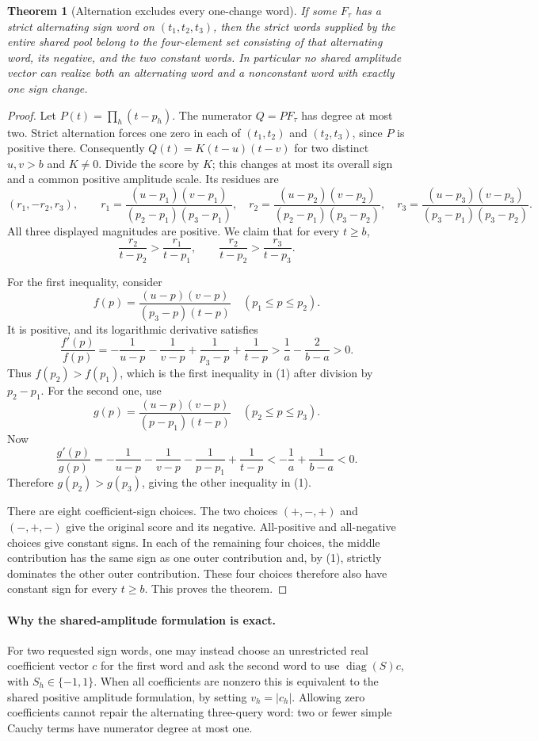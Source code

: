 \documentclass[11pt]{article}
\newtheorem{theorem}{Theorem}
\begin{document}
\begin{theorem}[Alternation excludes every one-change word]
If some $F_\tau$ has a strict alternating sign word on
$(t_1,t_2,t_3)$, then the strict words supplied by the entire shared
pool belong to the four-element set consisting of that alternating
word, its negative, and the two constant words. In particular no
shared amplitude vector can realize both an alternating word and a
nonconstant word with exactly one sign change.
\end{theorem}
\begin{proof}
Let $P(t)=\prod_h(t-p_h)$. The numerator $Q=P F_\tau$ has degree at
most two. Strict alternation forces one zero in each of
$(t_1,t_2)$ and $(t_2,t_3)$, since $P$ is positive there.
Consequently $Q(t)=K(t-u)(t-v)$ for two distinct $u,v>b$ and
$K\ne0$. Divide the score by $K$; this changes at most its overall
sign and a common positive amplitude scale. Its residues are
\[
 (r_1,-r_2,r_3),\qquad
 r_1=\frac{(u-p_1)(v-p_1)}{(p_2-p_1)(p_3-p_1)},\quad
 r_2=\frac{(u-p_2)(v-p_2)}{(p_2-p_1)(p_3-p_2)},\quad
 r_3=\frac{(u-p_3)(v-p_3)}{(p_3-p_1)(p_3-p_2)}.
\]
All three displayed magnitudes are positive. We claim that for every
$t\geq b$,
\[
 \frac{r_2}{t-p_2}>\frac{r_1}{t-p_1},\qquad
 \frac{r_2}{t-p_2}>\frac{r_3}{t-p_3}.                 \tag{1}
\]

For the first inequality, consider
\[
 f(p)=\frac{(u-p)(v-p)}{(p_3-p)(t-p)}
 \quad (p_1\leq p\leq p_2).
\]
It is positive, and its logarithmic derivative satisfies
\[
 \frac{f'(p)}{f(p)}
 =-\frac1{u-p}-\frac1{v-p}+\frac1{p_3-p}+\frac1{t-p}
 >\frac1a-\frac2{b-a}>0.
\]
Thus $f(p_2)>f(p_1)$, which is the first inequality in (1) after
division by $p_2-p_1$. For the second one, use
\[
 g(p)=\frac{(u-p)(v-p)}{(p-p_1)(t-p)}
 \quad (p_2\leq p\leq p_3).
\]
Now
\[
 \frac{g'(p)}{g(p)}
 =-\frac1{u-p}-\frac1{v-p}-\frac1{p-p_1}+\frac1{t-p}
 < -\frac1a+\frac1{b-a}<0.
\]
Therefore $g(p_2)>g(p_3)$, giving the other inequality in (1).

There are eight coefficient-sign choices. The two choices
$(+,-,+)$ and $(-,+,-)$ give the original score and its negative.
All-positive and all-negative choices give constant signs. In each
of the remaining four choices, the middle contribution has the
same sign as one outer contribution and, by (1), strictly dominates
the other outer contribution. These four choices therefore also
have constant sign for every $t\geq b$. This proves the theorem.
\end{proof}

\paragraph{Why the shared-amplitude formulation is exact.}
For two requested sign words, one may instead choose an unrestricted
real coefficient vector $c$ for the first word and ask the second
word to use $\operatorname{diag}(S)c$, with $S_h\in\{-1,1\}$.
When all coefficients are nonzero this is equivalent to the shared
positive amplitude formulation, by setting $v_h=|c_h|$. Allowing
zero coefficients cannot repair the alternating three-query word:
two or fewer simple Cauchy terms have numerator degree at most one.
\end{document}
